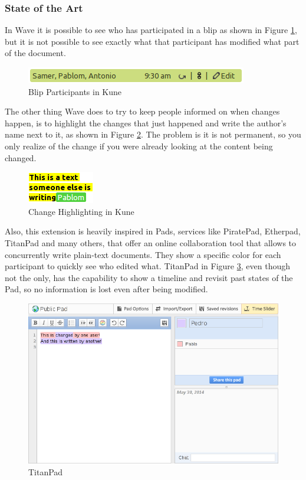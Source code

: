 \subsubsection{State of the Art}
In Wave it is possible to see who has participated in a blip as shown in Figure \ref{fig:participants}, but it is not possible to see exactly what that participant has modified what part of the document.
\begin{figure}[H]
  \center
    \includegraphics[keepaspectratio, scale=0.7]{Media/Captures/Wave/Participants.png}
  \caption{Blip Participants in Kune}
  \label{fig:participants}
\end{figure}
The other thing Wave does to try to keep people informed on when changes happen, is to highlight the changes that just happened and write the author's name next to it, as shown in Figure \ref{fig:participants2}. The problem is it is not permanent, so you only realize of the change if you were already looking at the content being changed.
\begin{figure}[H]
  \center
    \includegraphics[keepaspectratio, scale=0.7]{Media/Captures/Wave/Participants2.png}
  \caption{Change Highlighting in Kune}
  \label{fig:participants2}
\end{figure}
Also, this extension is heavily inspired in Pads, services like PiratePad, Etherpad, TitanPad and many others, that offer an online collaboration tool that allows to concurrently write plain-text documents. They show a specific color for each participant to quickly see who edited what. TitanPad in Figure \ref{fig:titanpad}, even though not the only, has the capability to show a timeline and revisit past states of the Pad, so no information is lost even after being modified.
\begin{figure}[h]
  \center
    \includegraphics[keepaspectratio, scale=0.4]{Media/Captures/Soa/TitanPad.png}
  \caption{TitanPad}
  \label{fig:titanpad}
\end{figure}

